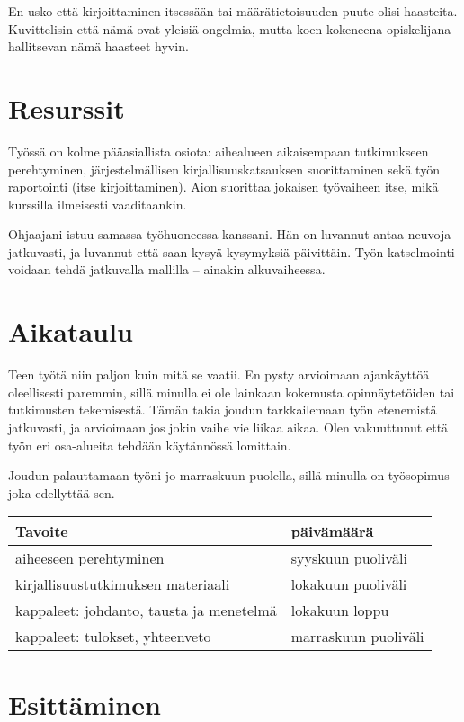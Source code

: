 \documentclass[12pt,a4paper,finnish,oneside]{article}
\begin{document}
En usko että kirjoittaminen itsessään tai määrätietoisuuden puute olisi
haasteita. Kuvittelisin että nämä ovat yleisiä ongelmia, mutta koen kokeneena
opiskelijana hallitsevan nämä haasteet hyvin.


\section{Resurssit}

Työssä on kolme pääasiallista osiota: aihealueen aikaisempaan tutkimukseen
perehtyminen, järjestelmällisen kirjallisuuskatsauksen suorittaminen sekä
työn raportointi (itse kirjoittaminen). Aion suorittaa jokaisen työvaiheen
itse, mikä kurssilla ilmeisesti vaaditaankin.

Ohjaajani istuu samassa työhuoneessa kanssani. Hän on luvannut antaa neuvoja
jatkuvasti, ja luvannut että saan kysyä kysymyksiä päivittäin. Työn katselmointi
voidaan tehdä jatkuvalla mallilla -- ainakin alkuvaiheessa.

\section{Aikataulu}

Teen työtä niin paljon kuin mitä se vaatii. En pysty arvioimaan ajankäyttöä
oleellisesti paremmin, sillä minulla ei ole lainkaan kokemusta opinnäytetöiden
tai tutkimusten tekemisestä. Tämän takia joudun tarkkailemaan työn etenemistä
jatkuvasti, ja arvioimaan jos jokin vaihe vie liikaa aikaa. Olen vakuuttunut
että työn eri osa-alueita tehdään käytännössä lomittain.

Joudun palauttamaan työni jo marraskuun puolella, sillä minulla on työsopimus
joka edellyttää sen.

\begin{tabular}{|p{30mm}|p{120mm}|}
\hline
    Tavoite   & päivämäärä \\ \hline
    aiheeseen perehtyminen   & syyskuun puoliväli \\
    kirjallisuustutkimuksen materiaali  & lokakuun puoliväli \\ 
    kappaleet: johdanto, tausta ja menetelmä   & lokakuun loppu \\ 
    kappaleet: tulokset, yhteenveto   & marraskuun puoliväli \\ 
\end{tabular}


\section{Esittäminen}
\end{document}

